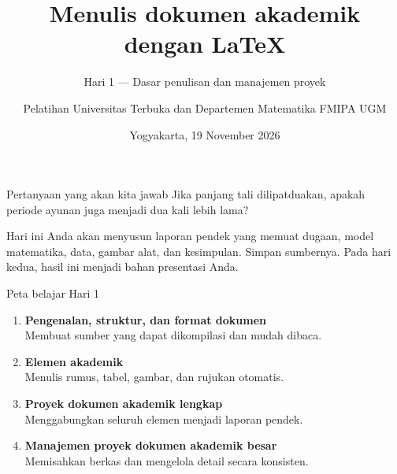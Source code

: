 \documentclass[aspectratio=169,11pt]{beamer}
\title{Menulis dokumen akademik dengan \LaTeX}
\subtitle{Hari 1 --- Dasar penulisan dan manajemen proyek}
\author{Pelatihan Universitas Terbuka dan Departemen Matematika FMIPA UGM}
\date{Yogyakarta, 19 November 2026}
\begin{document}
  \begin{frame}[plain]
  \inserttitle\par
  \insertsubtitle\par\medskip
  \par\medskip
  \insertauthor\par\smallskip
  \insertdate
  \end{frame}
  \begin{frame}[fragile]{Pertanyaan yang akan kita jawab}
  Jika panjang tali dilipatduakan, apakah periode ayunan juga menjadi dua kali lebih lama?
  \medskip

  Hari ini Anda akan menyusun laporan pendek yang memuat dugaan, model matematika, data, gambar alat, dan kesimpulan. Simpan sumbernya. Pada hari kedua, hasil ini menjadi bahan presentasi Anda.
  \end{frame}

  
  \begin{frame}{Peta belajar Hari 1}
  \begin{enumerate}
  \item \textbf{Pengenalan, struktur, dan format dokumen}\\
  Membuat sumber yang dapat dikompilasi dan mudah dibaca.
  \item \textbf{Elemen akademik}\\
  Menulis rumus, tabel, gambar, dan rujukan otomatis.
  \item \textbf{Proyek dokumen akademik lengkap}\\
  Menggabungkan seluruh elemen menjadi laporan pendek.
  \item \textbf{Manajemen proyek dokumen akademik besar}\\
  Memisahkan berkas dan mengelola detail secara konsisten.
  \end{enumerate}
  \end{frame}
\end{document}
